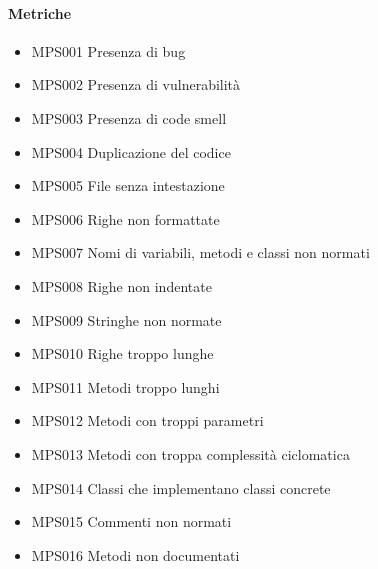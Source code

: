 		\paragraph*{Metriche} 
		\begin{itemize}
			\item MPS001 Presenza di bug
			\item MPS002 Presenza di vulnerabilità
			\item MPS003 Presenza di code smell
			\item MPS004 Duplicazione del codice
            \item MPS005 File senza intestazione
            \item MPS006 Righe non formattate
            \item MPS007 Nomi di variabili, metodi e classi non normati
            \item MPS008 Righe non indentate
            \item MPS009 Stringhe non normate
            \item MPS010 Righe troppo lunghe
            \item MPS011 Metodi troppo lunghi
            \item MPS012 Metodi con troppi parametri
            \item MPS013 Metodi con troppa complessità ciclomatica
            \item MPS014 Classi che implementano classi concrete
            \item MPS015 Commenti non normati
            \item MPS016 Metodi non documentati
		\end{itemize} 

